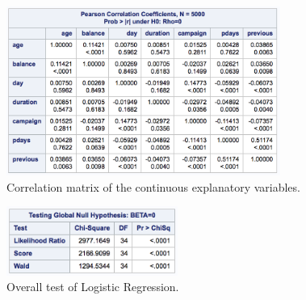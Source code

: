 \documentclass[]{article}
\begin{document}
\begin{figure}
  \centering
    \includegraphics[width=0.8\textwidth]{images/fig18_corr.png}
  \caption{Correlation matrix of the continuous explanatory variables.}
  \label{fig18}
\end{figure}

\begin{figure}
  \centering
    \includegraphics[width=0.5\textwidth]{images/fig19_overall_test.png}
  \caption{Overall test of Logistic Regression.}
  \label{fig19}
\end{figure}
\end{document}
